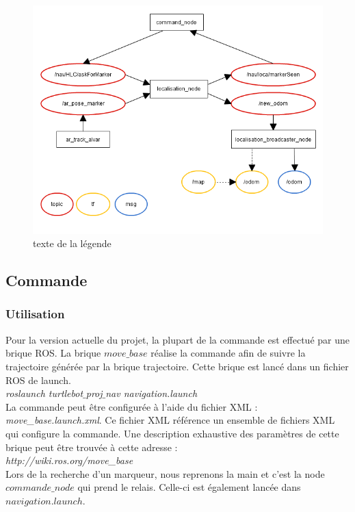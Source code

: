 \documentclass[10pt,a4paper]{article}
\begin{document}
\begin{figure}
\center
\includegraphics[scale=0.6]{figures/rqt_loca.png} 
\caption{texte de la légende}	
\end{figure}


\subsection{Commande}
\label{sec:commande}
\subsubsection*{Utilisation}

Pour la version actuelle du projet, la plupart de la commande est effectué par une brique ROS. La brique $move\_base$ réalise la commande afin de suivre la trajectoire générée par la brique trajectoire. Cette brique est lancé dans un fichier ROS de launch.\\
\textit{roslaunch turtlebot$\_$proj$\_$nav navigation.launch}\\
La commande peut être configurée à l'aide du fichier XML : \textit{move\_base.launch.xml}. Ce fichier XML référence un ensemble de fichiers XML qui configure la commande. Une description exhaustive des paramètres de cette brique peut être trouvée à cette adresse :\\
\textit{http://wiki.ros.org/move\_base}\\
Lors de la recherche d'un marqueur, nous reprenons la main et c'est la node $commande\_node$ qui prend le relais. Celle-ci est également lancée dans $navigation.launch$.
\end{document}
